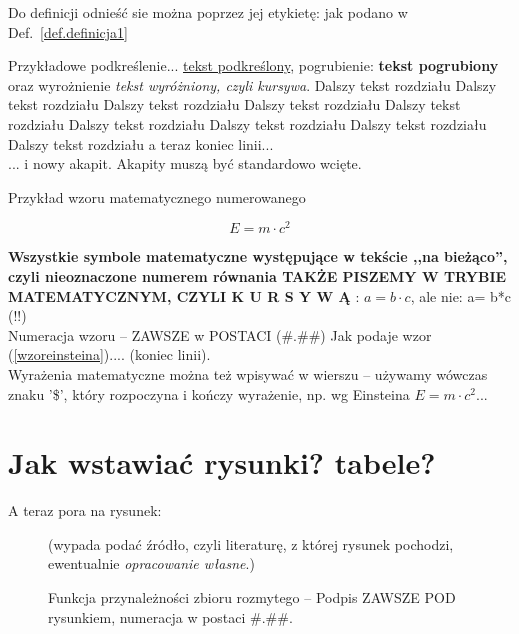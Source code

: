 \documentclass[12pt]{report}
\begin{document}
Do definicji odnieść sie można poprzez jej etykietę: jak podano w Def.~\ref{def.definicja1}

Przykładowe podkreślenie... \underline{tekst podkreślony}, pogrubienie: {\bf
tekst pogrubiony} oraz wyrożnienie {\em tekst wyróżniony, czyli kursywa}. 
Dalszy tekst rozdziału
Dalszy tekst rozdziału
Dalszy tekst rozdziału
Dalszy tekst rozdziału
Dalszy tekst rozdziału
Dalszy tekst rozdziału
Dalszy tekst rozdziału
Dalszy tekst rozdziału
Dalszy tekst rozdziału a teraz koniec linii... \\
\indent ... i nowy akapit. Akapity muszą być standardowo wcięte.  


Przykład wzoru matematycznego numerowanego

\begin{equation} \label{wzoreinsteina}
E=m\cdot c^2
\end{equation}

{\bf Wszystkie symbole matematyczne występujące w tekście ,,na bieżąco'',
czyli nieoznaczone numerem równania TAKŻE PISZEMY W TRYBIE MATEMA\-TYCZNYM, CZYLI
K U R S Y W Ą} : $a=b\cdot c$, ale nie: a= b*c (!!)\\

\indent Numeracja wzoru -- ZAWSZE w POSTACI (\#.\#\#)
Jak podaje wzor (\ref{wzoreinsteina}).... (koniec linii). \\
\indent Wyrażenia matematyczne można też wpisywać w wierszu -- używamy wów\-czas znaku '\$', który rozpoczyna i kończy wyrażenie, np. wg Einsteina $E=m\cdot c^2$...


\section{Jak wstawiać rysunki? tabele? }
A teraz pora na rysunek:
\begin{figure}[!t]
\centering
\caption{Funkcja przynależności zbioru rozmytego -- Podpis ZAWSZE POD rysunkiem,
numeracja w postaci \#.\#\#. } (wypada podać źródło, czyli literaturę,
z której rysunek pochodzi, ewentualnie {\em opracowanie własne}.)
\label{fig.funkcja.przyn}
\end{figure}
\end{document}
